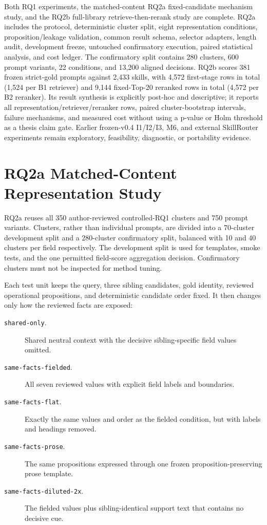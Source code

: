 Both RQ1 experiments, the matched-content RQ2a fixed-candidate mechanism study, and the RQ2b full-library retrieve-then-rerank study are complete. RQ2a includes the protocol, deterministic cluster split, eight representation conditions, proposition/leakage validation, common result schema, selector adapters, length audit, development freeze, untouched confirmatory execution, paired statistical analysis, and cost ledger. The confirmatory split contains 280 clusters, 600 prompt variants, 22 conditions, and 13,200 aligned decisions. RQ2b scores 381 frozen strict-gold prompts against 2,433 skills, with 4,572 first-stage rows in total (1,524 per B1 retriever) and 9,144 fixed-Top-20 reranked rows in total (4,572 per B2 reranker). Its result synthesis is explicitly post-hoc and descriptive; it reports all representation/retriever/reranker rows, paired cluster-bootstrap intervals, failure mechanisms, and measured cost without using a p-value or Holm threshold as a thesis claim gate. Earlier frozen-v0.4 I1/I2/I3, M6, and external SkillRouter experiments remain exploratory, feasibility, diagnostic, or portability evidence.

\section{RQ2a Matched-Content Representation Study}

RQ2a reuses all 350 author-reviewed controlled-RQ1 clusters and 750 prompt variants. Clusters, rather than individual prompts, are divided into a 70-cluster development split and a 280-cluster confirmatory split, balanced with 10 and 40 clusters per field respectively. The development split is used for templates, smoke tests, and the one permitted field-score aggregation decision. Confirmatory clusters must not be inspected for method tuning.

Each test unit keeps the query, three sibling candidates, gold identity, reviewed operational propositions, and deterministic candidate order fixed. It then changes only how the reviewed facts are exposed:

\begin{description}
  \item[\texttt{shared-only}.] Shared neutral context with the decisive sibling-specific field values omitted.
  \item[\texttt{same-facts-fielded}.] All seven reviewed values with explicit field labels and boundaries.
  \item[\texttt{same-facts-flat}.] Exactly the same values and order as the fielded condition, but with labels and headings removed.
  \item[\texttt{same-facts-prose}.] The same propositions expressed through one frozen proposition-preserving prose template.
  \item[\texttt{same-facts-diluted-2x}.] The fielded values plus sibling-identical support text that contains no decisive cue.
\end{description}

